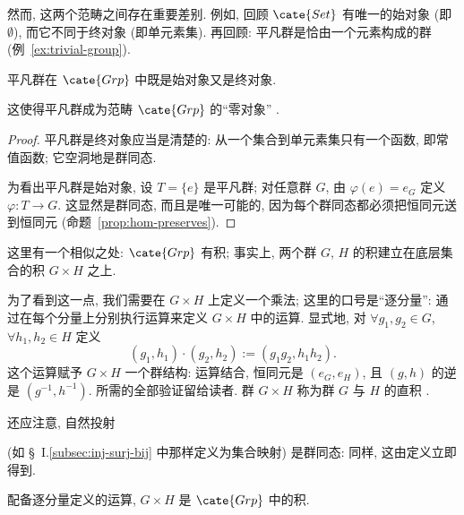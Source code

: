 然而, 这两个范畴之间存在重要差别. 例如, 回顾 $\cate{Set}$ 有唯一的始对象 (即 $\emptyset$), 而它不同于终对象 (即单元素集). 再回顾: 平凡群是恰由一个元素构成的群 (例~\ref{ex:trivial-group}).

\begin{proposition}
\label{prop:trivial-zero}
平凡群在 $\cate{Grp}$ 中既是始对象又是终对象.
\end{proposition}

这使得平凡群成为范畴 $\cate{Grp}$ 的``零对象''%
.

\begin{proof}
平凡群是终对象应当是清楚的: 从一个集合到单元素集只有一个函数, 即常值函数; 它空洞地是群同态.

为看出平凡群是始对象, 设 $T = \{e\}$ 是平凡群; 对任意群 $G$, 由 $\varphi(e) = e_G$ 定义 $\varphi : T \to G$. 这显然是群同态, 而且是唯一可能的, 因为每个群同态都必须把恒同元送到恒同元 (命题~\ref{prop:hom-preserves}).
\end{proof}

这里有一个相似之处: $\cate{Grp}$ 有积; 事实上, 两个群 $G$, $H$ 的积建立在底层集合的积 $G \times H$ 之上.

为了看到这一点, 我们需要在 $G \times H$ 上定义一个乘法; 这里的口号是``逐分量'': 通过在每个分量上分别执行运算来定义 $G \times H$ 中的运算. 显式地, 对 $\forall g_1, g_2 \in G$, $\forall h_1, h_2 \in H$ 定义
\[
(g_1, h_1) \cdot (g_2, h_2) := (g_1 g_2, h_1 h_2).
\]
这个运算赋予 $G \times H$ 一个群结构: 运算结合, 恒同元是 $(e_G, e_H)$, 且 $(g,h)$ 的逆是 $(g^{-1}, h^{-1})$. 所需的全部验证留给读者. 群 $G \times H$ 称为群 $G$ 与 $H$ 的直积%
.

还应注意, 自然投射
\begin{center}
\end{center}
(如 \S~I.\ref{subsec:inj-surj-bij} 中那样定义为集合映射) 是群同态: 同样, 这由定义立即得到.

\begin{proposition}
\label{prop:product-grp}
配备逐分量定义的运算, $G \times H$ 是 $\cate{Grp}$ 中的积.
\end{proposition}

